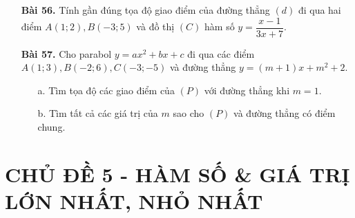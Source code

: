 \documentclass[12pt,a4paper]{article}
\begin{document}
\begin{enumerate}
\item[\textbf{Bài 56.}] Tính gần đúng tọa độ giao điểm của đường thẳng $(d)$ đi qua hai điểm $A(1;2), B(-3;5)$ và đồ thị $(C)$ hàm số $y = \dfrac{x-1}{3x+7}$.
\item[\textbf{Bài 57.}] Cho parabol $y=ax^2 + bx + c$ đi qua các điểm $A(1;3),B(-2;6),C(-3;-5)$ và đường thẳng $y =(m+1)x + m^2 + 2.$
\begin{enumerate}
\item[a.] Tìm tọa độ các giao điểm của $(P)$ với đường thẳng khi $m=1$.
\item[b.] Tìm tất cả các giá trị của $m$ sao cho $(P)$ và đường thẳng có điểm chung. 
\end{enumerate}
\end{enumerate}
\section*{CHỦ ĐỀ 5 - HÀM SỐ \& GIÁ TRỊ LỚN NHẤT, NHỎ NHẤT}
\end{document}

